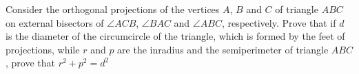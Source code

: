 Consider the orthogonal projections of the vertices $A$, $B$ and $C$ of triangle $ABC$ on external bisectors of $ \angle ACB$, $ \angle BAC$ and $ \angle ABC$, respectively. Prove that if $d$ is the diameter of the circumcircle of the triangle, which is formed by the feet of projections, while $r$ and $p$ are the inradius and the semiperimeter of triangle $ABC$, prove that $r^2+p^2=d^2$

